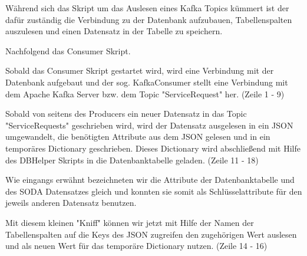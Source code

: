 Während sich das  Skript um das Auslesen eines Kafka Topics kümmert ist der 
dafür zuständig die Verbindung zu der Datenbank aufzubauen, Tabellenspalten auszulesen und einen Datensatz in der Tabelle zu speichern.

Nachfolgend das Consumer Skript.



Sobald das Consumer Skript gestartet wird, wird eine Verbindung mit der Datenbank
aufgebaut und der sog. KafkaConsumer stellt eine Verbindung mit dem Apache Kafka
Server bzw. dem Topic "ServiceRequest" her.
(Zeile 1 - 9)

Sobald von seitens des Producers ein neuer Datensatz in das Topic "ServiceRequests" geschrieben wird,
wird der Datensatz ausgelesen in ein \ac {JSON} umgewandelt, die benötigten Attribute aus dem \ac{JSON} gelesen
und in ein temporäres Dictionary geschrieben.
Dieses Dictionary wird abschließend mit Hilfe des DBHelper Skripts in die
Datenbanktabelle geladen.
(Zeile 11 - 18)

Wie eingangs erwähnt bezeichneten wir die Attribute der Datenbanktabelle und des \ac{SODA} Datensatzes gleich
und konnten sie somit als Schlüsselattribute für den jeweils anderen Datensatz benutzen.

Mit diesem kleinen "Kniff" können wir jetzt mit Hilfe der Namen der Tabellenspalten
auf die Keys des \ac{JSON} zugreifen den zugehörigen Wert auslesen und als neuen Wert für das temporäre Dictionary nutzen.
(Zeile 14 - 16)
